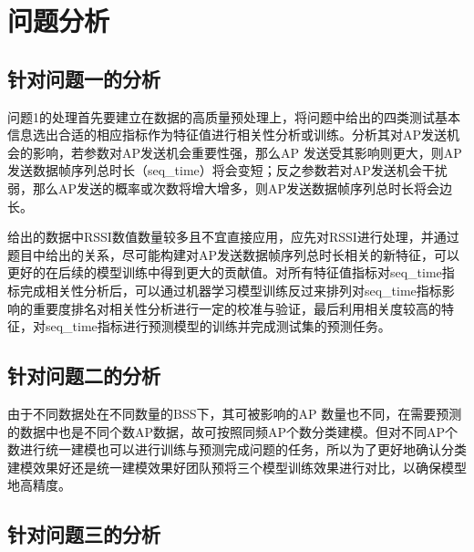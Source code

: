 \section{问题分析}
\subsection{针对问题一的分析}

问题1的处理首先要建立在数据的高质量预处理上，将问题中给出的四类测试基本信息选出合适的相应指标作为特征值进行相关性分析或训练。分析其对AP发送机会的影响，若参数对AP发送机会重要性强，那么AP 发送受其影响则更大，则AP发送数据帧序列总时长（seq\_time）将会变短；反之参数若对AP发送机会干扰弱，那么AP发送的概率或次数将增大增多，则AP发送数据帧序列总时长将会边长。

给出的数据中RSSI数值数量较多且不宜直接应用，应先对RSSI进行处理，并通过题目中给出的关系，尽可能构建对AP发送数据帧序列总时长相关的新特征，可以更好的在后续的模型训练中得到更大的贡献值。对所有特征值指标对seq\_time指标完成相关性分析后，可以通过机器学习模型训练反过来排列对seq\_time指标影响的重要度排名对相关性分析进行一定的校准与验证，最后利用相关度较高的特征，对seq\_time指标进行预测模型的训练并完成测试集的预测任务。

\subsection{针对问题二的分析}
由于不同数据处在不同数量的BSS下，其可被影响的AP 数量也不同，在需要预测的数据中也是不同个数AP数据，故可按照同频AP个数分类建模。但对不同AP个数进行统一建模也可以进行训练与预测完成问题的任务，所以为了更好地确认分类建模效果好还是统一建模效果好团队预将三个模型训练效果进行对比，以确保模型地高精度。

\subsection{针对问题三的分析}
